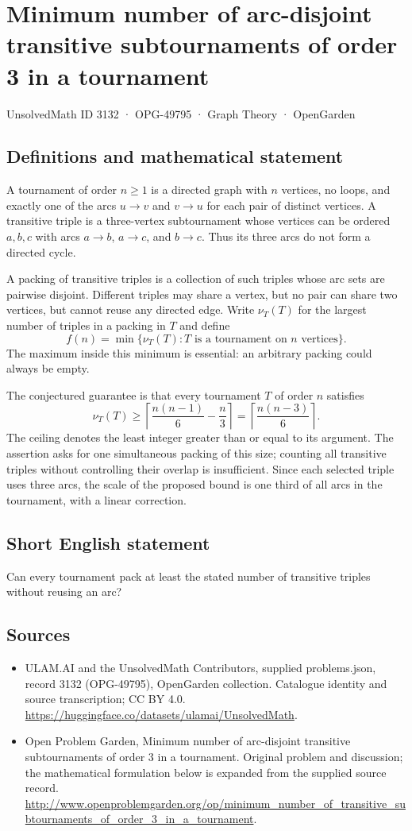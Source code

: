 \documentclass[11pt,a4paper]{article}
\begin{document}
\section*{Minimum number of arc-disjoint transitive subtournaments of order 3 in a tournament}\label{3132}
{\small UnsolvedMath ID 3132 · OPG-49795 · Graph Theory · OpenGarden}
\subsection{Definitions and mathematical statement}
A tournament of order $n\geq1$ is a directed graph with $n$ vertices,
no loops, and exactly one of the arcs $u\to v$ and $v\to u$ for each
pair of distinct vertices. A transitive triple is a three-vertex
subtournament whose vertices can be ordered $a,b,c$ with arcs
$a\to b$, $a\to c$, and $b\to c$. Thus its three arcs do not form
a directed cycle.

A packing of transitive triples is a collection of such triples whose
arc sets are pairwise disjoint. Different triples may share a vertex, but no pair can share
two vertices, but cannot reuse any directed edge. Write $\nu_T(T)$
for the largest number of triples in a packing in $T$ and define
\[
 f(n)=\min\{\nu_T(T):T\text{ is a tournament on }n\text{ vertices}\}.
\]
The maximum inside this minimum is essential: an arbitrary packing
could always be empty.

The conjectured guarantee is that every tournament $T$ of order $n$
satisfies
\[
 \nu_T(T)\geq
 \left\lceil\frac{n(n-1)}6-\frac n3\right\rceil
 =\left\lceil\frac{n(n-3)}6\right\rceil.
\]
The ceiling denotes the least integer greater than or equal to its
argument. The assertion asks for one simultaneous packing of this
size; counting all transitive triples without controlling their
overlap is insufficient. Since each selected triple uses three arcs,
the scale of the proposed bound is one third of all arcs in the
tournament, with a linear correction.
\subsection{Short English statement}
Can every tournament pack at least the stated number of transitive triples without reusing an arc?
\subsection{Sources}
\begin{itemize}
\item[S1] ULAM.AI and the UnsolvedMath Contributors, supplied problems.json, record 3132 (OPG-49795), OpenGarden collection. Catalogue identity and source transcription; CC BY 4.0.
\url{https://huggingface.co/datasets/ulamai/UnsolvedMath}.
\item[S2] Open Problem Garden, Minimum number of arc-disjoint transitive subtournaments of order 3 in a tournament. Original problem and discussion; the mathematical formulation below is expanded from the supplied source record.
\url{http://www.openproblemgarden.org/op/minimum_number_of_transitive_subtournaments_of_order_3_in_a_tournament}.
\end{itemize}
\end{document}
